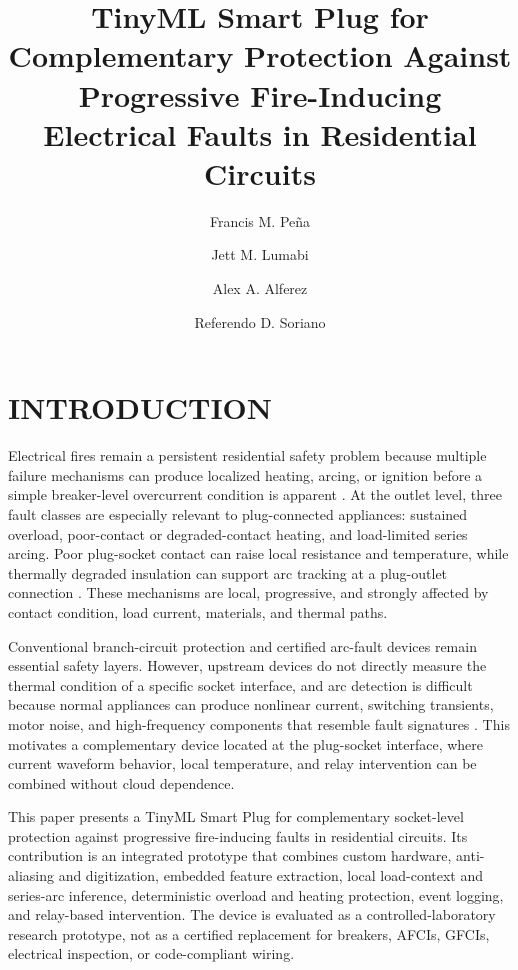 \documentclass[twocolumn,twoside]{base/ajstd}
\title{TinyML Smart Plug for Complementary Protection Against Progressive Fire-Inducing Electrical Faults in Residential Circuits}
\author[1,\mbox{*}]{Francis M. Pe\~{n}a}
\author[1]{Jett M. Lumabi}
\author[1]{Alex A. Alferez}
\author[1]{Referendo D. Soriano}
\affil[1]{College of Science, Engineering and Architecture, Ateneo de Naga University, Naga City 4400, Philippines}
\affil[$\mbox{*}$]{Corresponding author: \href{mailto:fpenaofficial@gmail.com}{fpenaofficial@gmail.com}}
\begin{document}
\setcounter{page}{1}

\maketitle
\thispagestyle{firststyle}
\linenumbers

\section{INTRODUCTION}

Electrical fires remain a persistent residential safety problem because multiple failure mechanisms can produce localized heating, arcing, or ignition before a simple breaker-level overcurrent condition is apparent \citep{Meng2024ElectricalFires,DaRocha2023ElectricalFireRisk,Taylor2024HomeFireInjuries}. At the outlet level, three fault classes are especially relevant to plug-connected appliances: sustained overload, poor-contact or degraded-contact heating, and load-limited series arcing. Poor plug-socket contact can raise local resistance and temperature, while thermally degraded insulation can support arc tracking at a plug-outlet connection \citep{Zhang2021PoorContact,Li2024PoorContact,Hadziefendic2018ReducedTorque,Okamoto2022ArcTracking}. These mechanisms are local, progressive, and strongly affected by contact condition, load current, materials, and thermal paths.

Conventional branch-circuit protection and certified arc-fault devices remain essential safety layers. However, upstream devices do not directly measure the thermal condition of a specific socket interface, and arc detection is difficult because normal appliances can produce nonlinear current, switching transients, motor noise, and high-frequency components that resemble fault signatures \citep{Lee2000AFCI,Zhao2022SeriesArc,Gong2022SeriesArc,Chen2024LightweightArc}. This motivates a complementary device located at the plug-socket interface, where current waveform behavior, local temperature, and relay intervention can be combined without cloud dependence.

This paper presents a TinyML Smart Plug for complementary socket-level protection against progressive fire-inducing faults in residential circuits. Its contribution is an integrated prototype that combines custom hardware, anti-aliasing and digitization, embedded feature extraction, local load-context and series-arc inference, deterministic overload and heating protection, event logging, and relay-based intervention. The device is evaluated as a controlled-laboratory research prototype, not as a certified replacement for breakers, AFCIs, GFCIs, electrical inspection, or code-compliant wiring.
\end{document}
